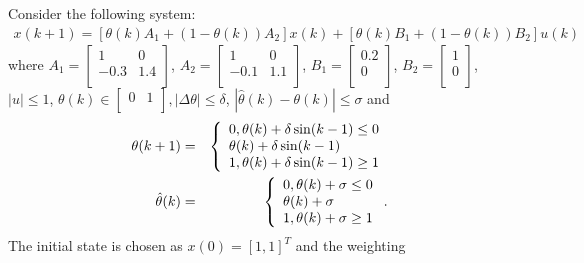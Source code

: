 \documentclass{singlecol-new}
\theoremstyle{TH}{
\newtheorem{lemma}{Lemma}
\newtheorem{theorem}[lemma]{Theorem}
\newtheorem{corrolary}[lemma]{Corrolary}
\newtheorem{conjecture}[lemma]{Conjecture}
\newtheorem{proposition}[lemma]{Proposition}
\newtheorem{claim}[lemma]{Claim}
\newtheorem{stheorem}[lemma]{Wrong Theorem}
\newtheorem{algorithm}{Algorithm}
}
\theoremstyle{THrm}{
\newtheorem{definition}{Definition}[section]
\newtheorem{question}{Question}[section]
\newtheorem{remark}{Remark}
\newtheorem{scheme}{Scheme}
}
\theoremstyle{THhit}{
\newtheorem{case}{Case}[section]
}
\begin{document}
Consider the following system:
\begin{eqnarray}
x(k + 1) = \left[{\theta (k)A_1  + \left( {1 - \theta (k)}
\right)A_2} \right]x(k) + \left[ {\theta (k)B_1  + \left({1 - \theta
(k)} \right)B_2 } \right]u(k)\nonumber
\end{eqnarray}
where $A_1  = \left[ {\begin{array}{cc}
   1 & 0  \\
   {-0.3} & {1.4}  \\
 \end{array} } \right]$, $A_2  = \left[ {\begin{array}{cc}
   1 & 0  \\
   {-0.1} & {1.1}  \\
 \end{array} } \right]$, $B_1  = \left[ {\begin{array}{c}
   {0.2}  \\
   0  \\
 \end{array} } \right]$, $B_2  = \left[{\begin{array}{c}
   1  \\
   0  \\
 \end{array} } \right]$,
 $\left| u \right| \leq 1$, $\theta (k) \in \left[ {\begin{array}{cc}
   0 & 1  \\
 \end{array} } \right],|\Delta \theta|\leq\delta$, $|\hat{\theta}(k)-\theta(k)|\leq \sigma$ and
 \begin{eqnarray*}
 \theta (k + 1) &=& \left\{ \begin{array}{l}
  0   ,\theta (k) + \delta\sin (k-1) \leq 0 \hfill \\
  \theta (k) + \delta\sin (k-1)   \hfill \\
  1 ,\theta (k) + \delta\sin (k-1) \ge 1 \hfill \\
\end{array} \right.\nonumber\\
\hat{\theta}(k) &=& \left\{ \begin{array}{l}
  0               ,\theta (k) +\sigma \leq 0 \hfill \\
  \theta (k) + \sigma \hfill \\
  1               ,\theta (k) + \sigma \ge 1 \hfill \\
\end{array}\right..
\end{eqnarray*}
The initial state is chosen as $x(0)=[1,1]^T$ and the weighting
\end{document}
